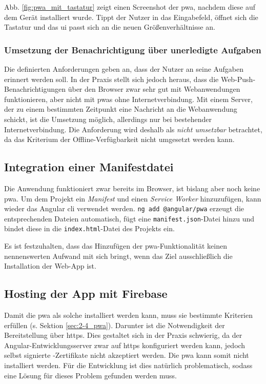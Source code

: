 Abb. \ref{fig:pwa_mit_tastatur} zeigt einen Screenshot der \ac{pwa}, nachdem diese auf dem Gerät installiert wurde. Tippt der Nutzer in das Eingabefeld, öffnet sich die Tastatur und das \ac{ui} passt sich an die neuen Größenverhältnisse an.

\subsubsection{Umsetzung der Benachrichtigung über unerledigte Aufgaben}
Die definierten Anforderungen geben an, dass der Nutzer an seine Aufgaben erinnert werden soll. In der Praxis stellt sich jedoch heraus, dass die Web-Push-Benachrichtigungen über den Browser zwar sehr gut mit Webanwendungen funktionieren, aber nicht mit \ac{pwa}s ohne Internetverbindung. Mit einem Server, der zu einem bestimmten Zeitpunkt eine Nachricht an die Webanwendung schickt, ist die Umsetzung möglich, allerdings nur bei bestehender Internetverbindung. Die Anforderung wird deshalb als \textit{nicht umsetzbar} betrachtet, da das Kriterium der Offline-Verfügbarkeit nicht umgesetzt werden kann.


\subsection{Integration einer Manifestdatei}

Die Anwendung funktioniert zwar bereits im Browser, ist bislang aber noch keine \ac{pwa}. Um dem Projekt ein \textit{Manifest} und einen \textit{Service Worker} hinzuzufügen, kann wieder das Angular \ac{cli} verwendet werden. \texttt{ng add @angular/pwa} erzeugt die entsprechenden Dateien automatisch, fügt eine \texttt{manifest.json}-Datei hinzu und bindet diese in die \texttt{index.html}-Datei des Projekts ein.

Es ist festzuhalten, dass das Hinzufügen der \ac{pwa}-Funktionalität keinen nennenswerten Aufwand mit sich bringt, wenn das Ziel ausschließlich die Installation der Web-App ist.

\subsection{Hosting der App mit Firebase}
Damit die \ac{pwa} als solche installiert werden kann, muss sie bestimmte Kriterien erfüllen (s. Sektion \ref{sec:2-4_pwa}). Darunter ist die Notwendigkeit der Bereitstellung über \ac{https}. Dies gestaltet sich in der Praxis schwierig, da der Angular-Entwicklungsserver zwar auf \ac{https} konfiguriert werden kann, jedoch selbst signierte -Zertifikate nicht akzeptiert werden. Die \ac{pwa} kann somit nicht installiert werden. Für die Entwicklung ist dies natürlich problematisch, sodass eine Lösung für dieses Problem gefunden werden muss.

